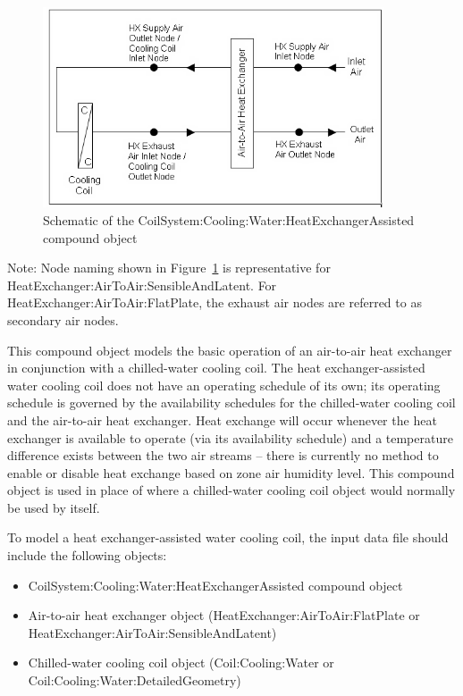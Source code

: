\begin{figure}[hbtp] %
\centering
\includegraphics[width=0.9\textwidth, height=0.9\textheight, keepaspectratio=true]{media/image370.png}
\caption{Schematic of the CoilSystem:Cooling:Water:HeatExchangerAssisted compound object \protect \label{fig:schematic-of-the-coilsystem-cooling-water}}
\end{figure}

Note: Node naming shown in Figure~\ref{fig:schematic-of-the-coilsystem-cooling-water} is representative for HeatExchanger:AirToAir:SensibleAndLatent. For HeatExchanger:AirToAir:FlatPlate, the exhaust air nodes are referred to as secondary air nodes.

This compound object models the basic operation of an air-to-air heat exchanger in conjunction with a chilled-water cooling coil. The heat exchanger-assisted water cooling coil does not have an operating schedule of its own; its operating schedule is governed by the availability schedules for the chilled-water cooling coil and the air-to-air heat exchanger. Heat exchange will occur whenever the heat exchanger is available to operate (via its availability schedule) and a temperature difference exists between the two air streams -- there is currently no method to enable or disable heat exchange based on zone air humidity level. This compound object is used in place of where a chilled-water cooling coil object would normally be used by itself.

To model a heat exchanger-assisted water cooling coil, the input data file should include the following objects:

\begin{itemize}
\item
  CoilSystem:Cooling:Water:HeatExchangerAssisted compound object
\item
  Air-to-air heat exchanger object (HeatExchanger:AirToAir:FlatPlate or HeatExchanger:AirToAir:SensibleAndLatent)
\item
  Chilled-water cooling coil object (Coil:Cooling:Water or Coil:Cooling:Water:DetailedGeometry)
\end{itemize}

